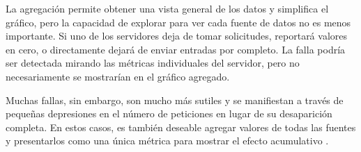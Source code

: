 La agregación permite obtener una vista general de los datos y simplifica el
gráfico, pero la capacidad de explorar para ver cada fuente de datos no es
menos importante. Si  uno de los servidores deja de tomar solicitudes,
reportará valores en cero, o directamente dejará de enviar entradas por
completo. La falla podría ser detectada mirando las métricas individuales del
servidor, pero no necesariamente se mostrarían en el gráfico agregado.

Muchas fallas, sin embargo, son mucho más sutiles y se manifiestan a través de
pequeñas depresiones en el número de peticiones en lugar de su desaparición
completa. En estos casos, es también deseable agregar valores de todas las
fuentes y presentarlos como una única métrica para mostrar el efecto
acumulativo \cite[p.~21-25]{monitoreo:efective_monitoring_and_alerting}.

